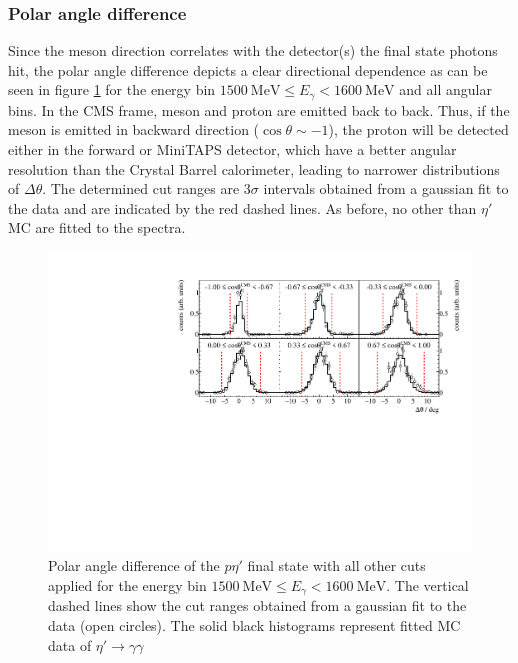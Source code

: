  \subsubsection{Polar angle difference}
 Since the meson direction correlates with the detector(s) the final state photons hit, the polar angle difference depicts a clear directional dependence as can be seen in figure \ref{fig:pol} for the energy bin $\SI{1500}{\mega\eV}\leq E_\gamma<\SI{1600}{\mega\eV}$ and all angular bins. In the CMS frame, meson and proton are emitted back to back. Thus, if the meson is emitted in backward direction ($\cos\theta\sim -1$), the proton will be detected either in the forward or MiniTAPS detector, which have a better angular resolution than the Crystal Barrel calorimeter, leading to narrower distributions of $\Delta\theta$. The determined cut ranges are $3\sigma$ intervals obtained from a gaussian fit to the data and are indicated by the red dashed lines. As before, no other than $\eta'$ MC are fitted to the spectra.
  \begin{figure}[htbp]
 	\centering
 	\includegraphics[width=\linewidth]{../figs/hydrogen/bin_cuts/thetacut_ebin1.pdf}
 	\caption{Polar angle difference of the $p\eta'$ final state with all other cuts applied for the energy bin $\SI{1500}{\mega\eV}\leq E_\gamma<\SI{1600}{\mega\eV}$. The vertical dashed lines show the cut ranges obtained from a gaussian fit to the data (open circles). The solid black histograms represent fitted MC data of $\eta'\to\gamma\gamma$}
 	\label{fig:pol}
 \end{figure}
